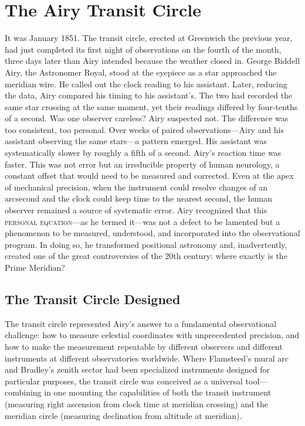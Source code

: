 \chapter{The Airy Transit Circle}
\label{ch:airy-transit-circle}

It was January 1851. The transit circle, erected at Greenwich the previous year, had just completed its first night of observations on the fourth of the month, three days later than Airy intended because the weather closed in. George Biddell Airy, the Astronomer Royal, stood at the eyepiece as a star approached the meridian wire. He called out the clock reading to his assistant. Later, reducing the data, Airy compared his timing to his assistant's. The two had recorded the same star crossing at the same moment, yet their readings differed by four-tenths of a second. Was one observer careless? Airy suspected not. The difference was too consistent, too personal. Over weeks of paired observations—Airy and his assistant observing the same stars—a pattern emerged. His assistant was systematically slower by roughly a fifth of a second. Airy's reaction time was faster. This was not error but an irreducible property of human neurology, a constant offset that would need to be measured and corrected. Even at the apex of mechanical precision, when the instrument could resolve changes of an arcsecond and the clock could keep time to the nearest second, the human observer remained a source of systematic error. Airy recognized that this \textsc{personal equation}—as he termed it—was not a defect to be lamented but a phenomenon to be measured, understood, and incorporated into the observational program. In doing so, he transformed positional astronomy and, inadvertently, created one of the great controversies of the 20th century: where exactly is the Prime Meridian?

\section{The Transit Circle Designed}

The transit circle represented Airy's answer to a fundamental observational challenge: how to measure celestial coordinates with unprecedented precision, and how to make the measurement repeatable by different observers and different instruments at different observatories worldwide. Where Flamsteed's mural arc and Bradley's zenith sector had been specialized instruments designed for particular purposes, the transit circle was conceived as a universal tool—combining in one mounting the capabilities of both the transit instrument (measuring right ascension from clock time at meridian crossing) and the meridian circle (measuring declination from altitude at meridian).

